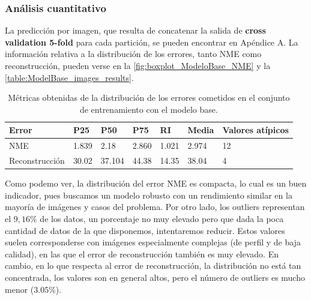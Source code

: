         \subsubsection*{Análisis cuantitativo}

        \noindent La predicción por imagen, que resulta de concatenar la salida de \textbf{cross validation 5-fold } para cada partición, se pueden encontrar en Apéndice A. La información relativa a la distribución de los errores, tanto NME como reconstrucción, pueden verse en la \autoref{fig:boxplot_ModeloBase_NME} y la \autoref{table:ModelBase_images_results}.

        \begin{table}[!ht]
            \centering
            \caption{Métricas obtenidas de la distribución de los errores cometidos en el conjunto de entrenamiento con el modelo base.}
            \begin{tabular}{|l|l|l|l|l|l|l|}
            \hline
                \cellcolor{gray!25}\textbf{Error} & \cellcolor{gray!25}\textbf{P25} & \cellcolor{gray!25}\textbf{P50} & \cellcolor{gray!25}\textbf{P75} & \cellcolor{gray!25}\textbf{RI} & \cellcolor{gray!25}\textbf{Media} & \cellcolor{gray!25}\textbf{Valores atípicos} \\ \hline
                NME & 1.839 & 2.18 & 2.860 & 1.021 & 2.974 & 12 \\ \hline
                Reconstrucción & 30.02 & 37.104 & 44.38 & 14.35 & 38.04 & 4 \\ \hline
            \end{tabular}
            \label{table:ModelBase_images_results}
        \end{table}
         
        \medskip

        \noindent Como podemo ver, la distribución del error NME es compacta, lo cual es un buen indicador, pues buscamos un modelo robusto con un rendimiento similar en la mayoría de imágenes y casos del problema. Por otro lado, los outliers representan el $9,16 \%$ de los datos, un porcentaje no muy elevado pero que dada la poca cantidad de datos de la que disponemos, intentaremos reducir. Estos valores suelen corresponderse con imágenes especialmente complejas (de perfil y de baja calidad), en las que el error de reconstrucción también es muy elevado. En cambio, en lo que respecta al error de reconstrucción, la distribución no está tan concentrada, los valores son en general altos, pero el número de outliers es mucho menor ($3.05\%$).

